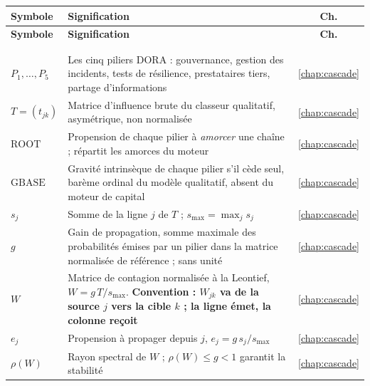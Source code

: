 \renewcommand{\arraystretch}{1.12}
{\small
\begin{longtable}{>{\raggedright}p{3.3cm} >{\raggedright\arraybackslash}p{10.2cm} c}
\toprule
\rowcolor{lightblue}
\textbf{Symbole} & \textbf{Signification} & \textbf{Ch.} \\
\midrule
\endfirsthead
\toprule
\rowcolor{lightblue}
\textbf{Symbole} & \textbf{Signification} & \textbf{Ch.} \\
\midrule
\endhead
\bottomrule
\multicolumn{3}{r@{}}{\footnotesize\itshape suite page suivante} \\
\endfoot
\bottomrule
\endlastfoot
\multicolumn{3}{@{}l}{\emph{\textcolor{navy}{Piliers et cascade dirigée}}} \\
$P_1,\dots,P_5$ & Les cinq piliers DORA : gouvernance, gestion des incidents, tests de résilience, prestataires tiers, partage d'informations & \ref{chap:cascade} \\
$T=(t_{jk})$ & Matrice d'influence brute du classeur qualitatif, asymétrique, non normalisée & \ref{chap:cascade} \\
$\mathrm{ROOT}$ & Propension de chaque pilier à \emph{amorcer} une chaîne ; répartit les amorces du moteur & \ref{chap:cascade} \\
$\mathrm{GBASE}$ & Gravité intrinsèque de chaque pilier s'il cède seul, barème ordinal du modèle qualitatif, absent du moteur de capital & \ref{chap:cascade} \\
$s_j$ & Somme de la ligne $j$ de $T$ ; $s_{\max}=\max_j s_j$ & \ref{chap:cascade} \\
$g$ & Gain de propagation, somme maximale des probabilités émises par un pilier dans la matrice normalisée de référence ; sans unité & \ref{chap:cascade} \\
$W$ & Matrice de contagion normalisée à la Leontief, $W=g\,T/s_{\max}$. \textbf{Convention : $W_{jk}$ va de la source $j$ vers la cible $k$ ; la ligne émet, la colonne reçoit} & \ref{chap:cascade} \\
$e_j$ & Propension à propager depuis $j$, $e_j=g\,s_j/s_{\max}$ & \ref{chap:cascade} \\
$\rho(W)$ & Rayon spectral de $W$ ; $\rho(W)\le g<1$ garantit la stabilité & \ref{chap:cascade} \\

\end{longtable}}
